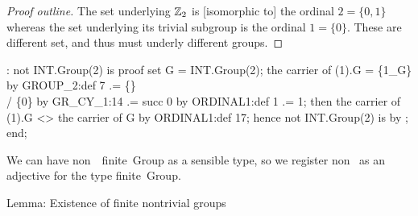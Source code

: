 \begin{proof}[Proof outline]
The set underlying $\mathbb{Z}_{2}$ is [isomorphic to] the ordinal
$2=\{0,1\}$ whereas the set underlying its trivial subgroup is the
ordinal $1=\{0\}$. These are different set, and thus must underly
different groups.
\end{proof}

\nwenddocs{}\endmoddef\nwstartdeflinemarkup{}\nwenddeflinemarkup
{}:
  not INT.Group(2) is 
proof
  set G = INT.Group(2);
  the carrier of (1).G = \{1_G\} by GROUP_2:def 7
                      .= \{\} \\/ \{0\} by GR_CY_1:14
                      .= succ 0 by ORDINAL1:def 1
                      .= 1;
  then the carrier of (1).G <> the carrier of G by ORDINAL1:def 17;
  hence not INT.Group(2) is  by ;
end;
\eatline
{}\nwendcode{}\nwdocspar
\begin{registration}
We can have {\Tt{}non\ \ finite\ Group\nwendquote} as a sensible type, so we
register {\Tt{}non\ \nwendquote} as an adjective for the type {\Tt{}finite\ Group\nwendquote}.
\end{registration}

\nwenddocs{}\endmoddef\nwstartdeflinemarkup{}\nwenddeflinemarkup
\LA{}Lemma: Existence of finite nontrivial groups~{\nwtagstyle{}}\RA{}

